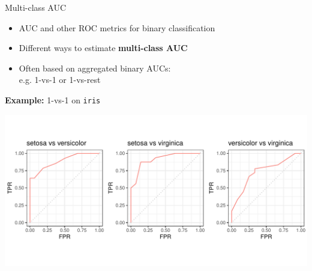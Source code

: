 



\begin{vbframe}{Multi-class AUC}


\begin{itemize}
  \item AUC and other ROC metrics for binary classification
  \item Different ways to estimate \textbf{multi-class AUC}
  \item Often based on aggregated binary AUCs:\\ %
  e.g. 1-vs-1 or 1-vs-rest
\end{itemize}

\vfill



\textbf{Example:} 1-vs-1 on \texttt{iris}

\centering
\includegraphics[trim = 0 40 -20 40, clip, width=\textwidth]{figure/eval_auc_extensions}




\end{vbframe}
